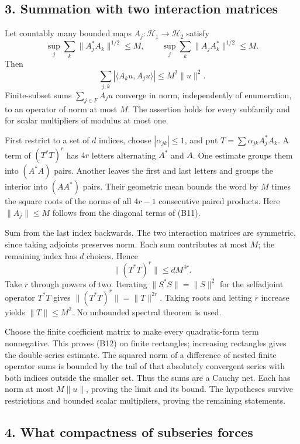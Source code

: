 \documentclass[
  11pt,
]{article}
\begin{document}
\subsection{3. Summation with two interaction
matrices}\label{summation-with-two-interaction-matrices}

Let countably many bounded maps \(A_j:\mathcal H_1\to\mathcal H_2\)
satisfy \[
 \sup_j\sum_k\|A_j^*A_k\|^{1/2}\le M,
 \qquad \sup_j\sum_k\|A_jA_k^*\|^{1/2}\le M.
 \tag{B11}
\] Then \[
 \sum_{j,k}|\langle A_ku,A_ju\rangle|\le M^2\|u\|^2.
 \tag{B12}
\] Finite-subset sums \(\sum_{j\in F}A_ju\) converge in norm,
independently of enumeration, to an operator of norm at most \(M\). The
assertion holds for every subfamily and for scalar multipliers of
modulus at most one.

First restrict to a set of \(d\) indices, choose \(|\alpha_{jk}|\le1\),
and put \(T=\sum\alpha_{jk}A_j^*A_k\). A term of \((T^*T)^r\) has \(4r\)
letters alternating \(A^*\) and \(A\). One estimate groups them into
\((A^*A)\) pairs. Another leaves the first and last letters and groups
the interior into \((AA^*)\) pairs. Their geometric mean bounds the word
by \(M\) times the square roots of the norms of all \(4r-1\) consecutive
paired products. Here \(\|A_j\|\le M\) follows from the diagonal terms
of (B11).

Sum from the last index backwards. The two interaction matrices are
symmetric, since taking adjoints preserves norm. Each sum contributes at
most \(M\); the remaining index has \(d\) choices. Hence \[
 \|(T^*T)^r\|\le dM^{4r}.
 \tag{B13}
\] Take \(r\) through powers of two. Iterating \(\|S^*S\|=\|S\|^2\) for
the selfadjoint operator \(T^*T\) gives \(\|(T^*T)^r\|=\|T\|^{2r}\).
Taking roots and letting \(r\) increase yields \(\|T\|\le M^2\). No
unbounded spectral theorem is used.

Choose the finite coefficient matrix to make every quadratic-form term
nonnegative. This proves (B12) on finite rectangles; increasing
rectangles gives the double-series estimate. The squared norm of a
difference of nested finite operator sums is bounded by the tail of that
absolutely convergent series with both indices outside the smaller set.
Thus the sums are a Cauchy net. Each has norm at most \(M\|u\|\),
proving the limit and its bound. The hypotheses survive restrictions and
bounded scalar multipliers, proving the remaining statements.

\subsection{4. What compactness of subseries
forces}\label{what-compactness-of-subseries-forces}
\end{document}
